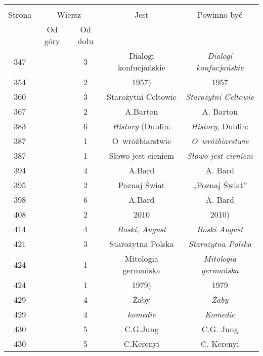 \documentclass[a4paper,11pt]{article}
\begin{document}
\begin{center}
  \begin{tabular}{|c|c|c|c|c|}
    \hline
    & \multicolumn{2}{c|}{} & & \\
    Strona & \multicolumn{2}{c|}{Wiersz} & Jest
                              & Powinno być \\ \cline{2-3}
    & Od góry & Od dołu & & \\
    \hline
    347 & &  3 & Dialogi konfucjańskie & \textit{Dialogi konfucjańskie} \\
    354 & &  2 & 1957) & 1957 \\
    360 & &  3 & Starożytni Celtowie & \textit{Starożytni Celtowie} \\
    367 & &  2 & A.Barton & A. Barton \\
    383 & &  6 & \textit{History} (Dublin: & \textit{History}, Dublin: \\
    387 & &  1 & O~wróżbiarstwie & \textit{O~wróżbiarstwie} \\
    387 & &  1 & Słowo jest cieniem & \textit{Słowo jest cieniem} \\
    394 & &  4 & A.Bard & A. Bard \\
    395 & &  2 & Poznaj Świat & „Poznaj Świat” \\
    398 & &  6 & A.Bard & A. Bard \\
    408 & &  2 & 2010 & 2010) \\
    414 & &  4 & \textit{Boski, August} & \textit{Boski August} \\
    421 & &  3 & Starożytna Polska & \textit{Starożytna Polska} \\
    424 & &  1 & Mitologia germańska & \textit{Mitologia germańska} \\
    424 & &  1 & 1979) & 1979 \\
    429 & &  4 & Żaby & \textit{Żaby} \\
    429 & &  4 & \textit{komedie} & \textit{Komedie} \\
    430 & &  5 & C.G.Jung & C.G. Jung \\
    430 & &  5 & C.Kerenyi & C. Kerenyi \\
    \hline
  \end{tabular}






\end{center}
\end{document}
